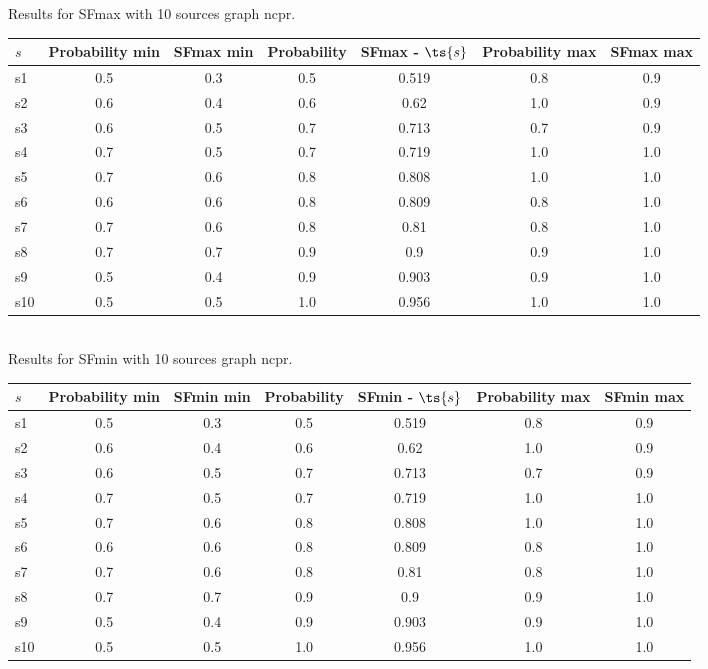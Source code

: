\documentclass{article}
\begin{document}
\noindent Results for SFmax with 10 sources graph ncpr.

\noindent\begin{tabular}{|l|c|c|c|c|c|c|}
\hline
$s$& Probability min & SFmax min & Probability & SFmax - $\ts{s}$ & Probability max & SFmax max\\
\hline
s1 &0.5 & 0.3 & 0.5 & 0.519 & 0.8 & 0.9\\
\hline
s2 &0.6 & 0.4 & 0.6 & 0.62 & 1.0 & 0.9\\
\hline
s3 &0.6 & 0.5 & 0.7 & 0.713 & 0.7 & 0.9\\
\hline
s4 &0.7 & 0.5 & 0.7 & 0.719 & 1.0 & 1.0\\
\hline
s5 &0.7 & 0.6 & 0.8 & 0.808 & 1.0 & 1.0\\
\hline
s6 &0.6 & 0.6 & 0.8 & 0.809 & 0.8 & 1.0\\
\hline
s7 &0.7 & 0.6 & 0.8 & 0.81 & 0.8 & 1.0\\
\hline
s8 &0.7 & 0.7 & 0.9 & 0.9 & 0.9 & 1.0\\
\hline
s9 &0.5 & 0.4 & 0.9 & 0.903 & 0.9 & 1.0\\
\hline
s10 &0.5 & 0.5 & 1.0 & 0.956 & 1.0 & 1.0\\
\hline
\end{tabular}\\

\noindent Results for SFmin with 10 sources graph ncpr.

\noindent\begin{tabular}{|l|c|c|c|c|c|c|}
\hline
$s$& Probability min & SFmin min & Probability & SFmin - $\ts{s}$ & Probability max & SFmin max\\
\hline
s1 &0.5 & 0.3 & 0.5 & 0.519 & 0.8 & 0.9\\
\hline
s2 &0.6 & 0.4 & 0.6 & 0.62 & 1.0 & 0.9\\
\hline
s3 &0.6 & 0.5 & 0.7 & 0.713 & 0.7 & 0.9\\
\hline
s4 &0.7 & 0.5 & 0.7 & 0.719 & 1.0 & 1.0\\
\hline
s5 &0.7 & 0.6 & 0.8 & 0.808 & 1.0 & 1.0\\
\hline
s6 &0.6 & 0.6 & 0.8 & 0.809 & 0.8 & 1.0\\
\hline
s7 &0.7 & 0.6 & 0.8 & 0.81 & 0.8 & 1.0\\
\hline
s8 &0.7 & 0.7 & 0.9 & 0.9 & 0.9 & 1.0\\
\hline
s9 &0.5 & 0.4 & 0.9 & 0.903 & 0.9 & 1.0\\
\hline
s10 &0.5 & 0.5 & 1.0 & 0.956 & 1.0 & 1.0\\
\hline
\end{tabular}\\
\end{document}
